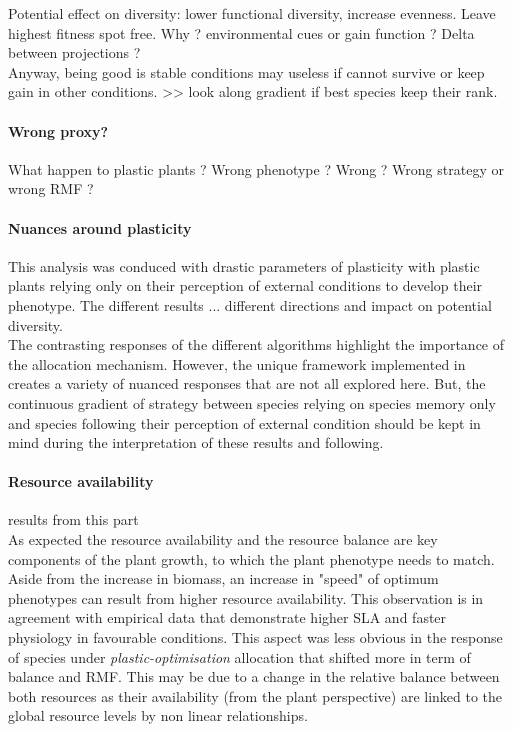 Potential effect on diversity: lower functional diversity, increase evenness. Leave highest fitness spot free. Why ? environmental cues or gain function ? Delta between projections ? \\

Anyway, being good is stable conditions may useless if cannot survive or keep gain in other conditions. >> look along gradient if best species keep their rank.\\

\paragraph{Wrong proxy?}

What happen to plastic plants ? Wrong phenotype ? Wrong  ? Wrong strategy or wrong RMF ? 

\paragraph{Nuances around plasticity}
This analysis was conduced with drastic parameters of plasticity with plastic plants relying only on their perception of external conditions to develop their phenotype. The different results ... different directions and impact on potential diversity.\\
The contrasting responses of the different algorithms highlight the importance of the allocation mechanism. However, the unique framework implemented in \model creates a variety of nuanced responses that are not all explored here. But, the continuous gradient of strategy between species relying on species memory only and species following their perception of external condition should be kept in mind during the interpretation of these results and following.

\paragraph{Resource availability}

results from this part\\
As expected the resource availability and the resource balance are key components of the plant growth, to which the plant phenotype needs to match. Aside from the increase in biomass, an increase in "speed" of optimum phenotypes can result from higher resource availability. This observation is in agreement with empirical data that demonstrate higher SLA and faster physiology in favourable conditions. This aspect was less obvious in the response of species under \textit{plastic-optimisation} allocation that shifted more in term of balance and RMF. This may be due to a change in the relative balance between both resources as their availability (from the plant perspective) are linked to the global resource levels by non linear relationships.

